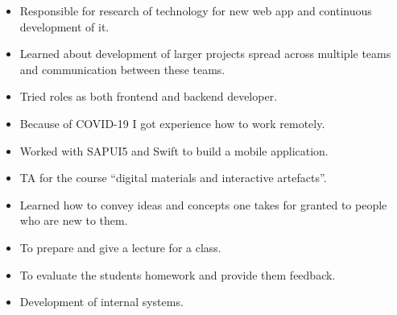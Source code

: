 \documentclass[10pt,a4paper,ragged2e,dvipsnames]{altacv}
\begin{document}
    \begin{itemize}
      \item Responsible for research of technology for new web app and continuous development of it.
      \item Learned about development of larger projects spread across multiple
      teams and communication between these teams.
      \item Tried roles as both frontend and backend developer.
      \item Because of COVID-19 I got experience how to work remotely.
    \end{itemize}

    \divider

    \begin{itemize}
      \item Worked with SAPUI5 and Swift to build a mobile application.
    \end{itemize}

    \divider

    \begin{itemize}
      \item TA for the course ``digital materials and interactive artefacts''.
      \item Learned how to convey ideas and concepts one takes for granted to people who are new to them.
      \item To prepare and give a lecture for a class.
      \item To evaluate the students homework and provide them feedback.
    \end{itemize}

    \divider

    \begin{itemize}
      \item Development of internal systems.
    \end{itemize}


\end{document}
